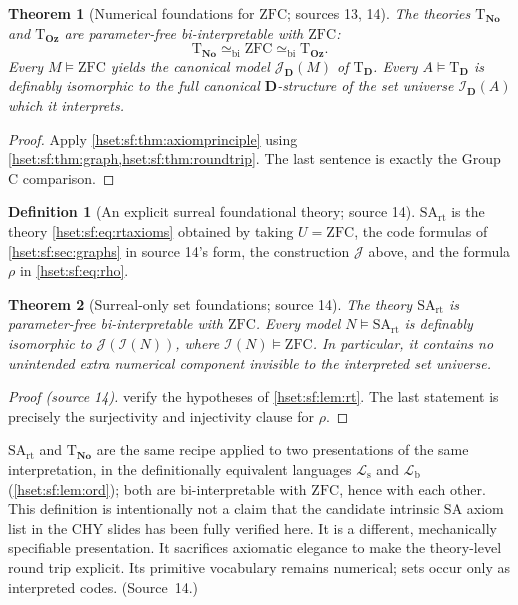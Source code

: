 \documentclass[11pt,letterpaper]{article}
\newtheorem{theorem}{Theorem}[section]
\theoremstyle{definition}
\newtheorem{definition}[definition]{Definition}\aliascntresetthe{definition}
\theoremstyle{remark}
\newcommand{\No}{\mathbf{No}}
\newcommand{\I}{\mathcal I}
\newcommand{\J}{\mathcal J}
\newcommand{\ZFC}{\mathrm{ZFC}}
\newcommand{\Oz}{\mathbf{Oz}}
\newcommand{\Dd}{\mathbf{D}}
\newcommand{\Lb}{\mathcal L_{\mathrm b}}
\newcommand{\Ls}{\mathcal L_{\mathrm s}}
\newcommand{\Tth}{\mathrm{T}}
\newcommand{\SArt}{\mathrm{SA}_{\mathrm{rt}}}
\newcommand{\bi}{\simeq_{\mathrm{bi}}}
\begin{document}
\begin{theorem}[Numerical foundations for $\ZFC$; sources 13, 14]\label{hset:sf:thm:theories}
The theories $\Tth_{\No}$ and $\Tth_{\Oz}$ are parameter-free bi-interpretable
with $\ZFC$:
\[
 \Tth_{\No}\bi\ZFC\bi\Tth_{\Oz}.
\]
Every $M\models\ZFC$ yields the canonical model $\J_{\Dd}(M)$ of $\Tth_{\Dd}$.
Every $A\models\Tth_{\Dd}$ is definably isomorphic to the full canonical
$\Dd$-structure of the set universe $\I_{\Dd}(A)$ which it interprets.
\end{theorem}
\begin{proof}
Apply \cref{hset:sf:thm:axiomprinciple} using
\cref{hset:sf:thm:graph,hset:sf:thm:roundtrip}. The last sentence is exactly the
Group C comparison.
\end{proof}

\begin{definition}[An explicit surreal foundational theory; source 14]
\label{hset:sf:def:SArt}
$\SArt$ is the theory \eqref{hset:sf:eq:rtaxioms} obtained by taking $U=\ZFC$, the
code formulas of \cref{hset:sf:sec:graphs} in source 14's form, the construction
$\J$ above, and the formula $\rho$ in \eqref{hset:sf:eq:rho}.
\end{definition}

\begin{theorem}[Surreal-only set foundations; source 14]\label{hset:sf:thm:surrealtheory}
The theory $\SArt$ is parameter-free bi-interpretable with $\ZFC$. Every model
$N\models\SArt$ is definably isomorphic to $\J(\I(N))$, where $\I(N)\models\ZFC$.
In particular, it contains no unintended extra numerical component invisible to
the interpreted set universe.
\end{theorem}
\begin{proof}[Proof (source 14)]
 verify the hypotheses of
\cref{hset:sf:lem:rt}. The last statement is precisely the surjectivity and
injectivity clause for $\rho$.
\end{proof}

$\SArt$ and $\Tth_{\No}$ are the same recipe applied to two presentations of the
same interpretation, in the definitionally equivalent languages $\Ls$ and $\Lb$
(\cref{hset:sf:lem:ord}); both are bi-interpretable with $\ZFC$, hence with each
other. This definition is intentionally not a claim that the candidate intrinsic
SA axiom list in the CHY slides \cite{CHYCUNY} has been fully verified here. It is
a different, mechanically specifiable presentation. It sacrifices axiomatic
elegance to make the theory-level round trip explicit. Its primitive vocabulary
remains numerical; sets occur only as interpreted codes. (Source~14.)
\end{document}
